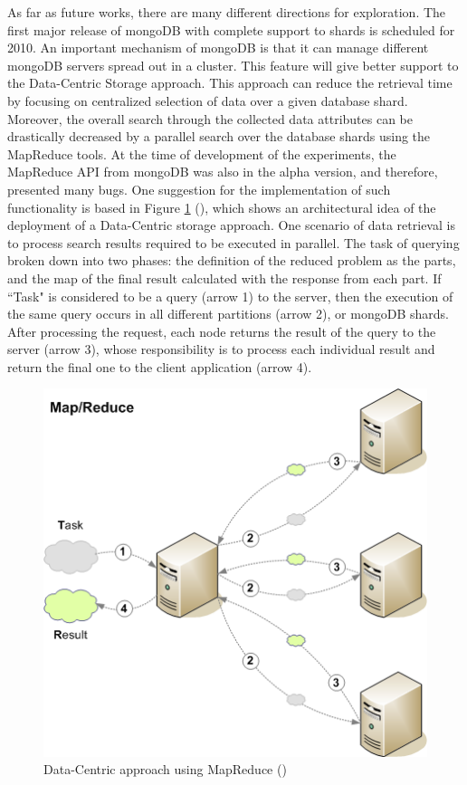 As far as future works, there are many different directions for exploration.
The first major release of mongoDB with complete support to shards is
scheduled for 2010. An important mechanism of mongoDB is that it can
manage different mongoDB servers spread out in a cluster. This feature will give
better support to the Data-Centric Storage approach. This approach can reduce
the retrieval time by focusing on centralized selection of data over a given
database shard. Moreover, the overall search through the collected data
attributes can be drastically decreased by a parallel search over the database
shards using the MapReduce \cite{map-reduce} tools. At the time of development
of the experiments, the MapReduce API from mongoDB was also in the alpha
version, and therefore, presented many bugs. One suggestion for the
implementation of such functionality is based in Figure
\ref{fig:future-works-data-centric-map-reduce} (\cite{map-reduce-notes}), which
shows an architectural idea of the deployment of a Data-Centric storage
approach. One scenario of data retrieval is to process search results
required to be executed in parallel. The task of querying broken down into
two phases: the definition of the reduced problem as the parts, and the
map of the final result calculated with the response from each part. If
``Task" is considered to be a query (arrow 1) to the server, then the
execution of the same query occurs in all different partitions (arrow 2), or
mongoDB shards. After processing the request, each node returns the result of
the query to the server (arrow 3), whose responsibility is to process each
individual result and return the final one to the client application (arrow
4).

\begin{figure}[!h]
  \centering
  \includegraphics[scale=0.65]{../diagrams/future-works-data-centric-map-reduce}
  \caption{Data-Centric approach using MapReduce (\cite{map-reduce-notes})}
  \label{fig:future-works-data-centric-map-reduce}
\end{figure}

